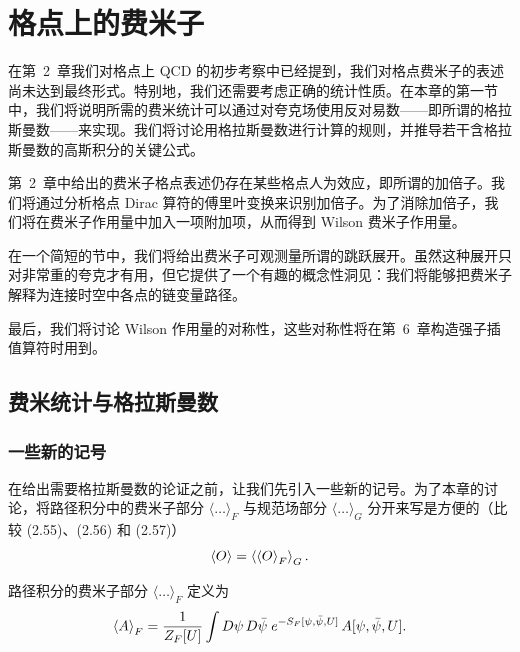 
\chapter{格点上的费米子}

在第~2~章我们对格点上 QCD 的初步考察中已经提到，我们对格点费米子的表述尚未达到最终形式。特别地，我们还需要考虑正确的统计性质。在本章的第一节中，我们将说明所需的费米统计可以通过对夸克场使用反对易数——即所谓的格拉斯曼数——来实现。我们将讨论用格拉斯曼数进行计算的规则，并推导若干含格拉斯曼数的高斯积分的关键公式。

第~2~章中给出的费米子格点表述仍存在某些格点人为效应，即所谓的加倍子。我们将通过分析格点 Dirac 算符的傅里叶变换来识别加倍子。为了消除加倍子，我们将在费米子作用量中加入一项附加项，从而得到 Wilson 费米子作用量。

在一个简短的节中，我们将给出费米子可观测量所谓的跳跃展开。虽然这种展开只对非常重的夸克才有用，但它提供了一个有趣的概念性洞见：我们将能够把费米子解释为连接时空中各点的链变量路径。

最后，我们将讨论 Wilson 作用量的对称性，这些对称性将在第~6~章构造强子插值算符时用到。

\section{费米统计与格拉斯曼数}

\subsection{一些新的记号}

在给出需要格拉斯曼数的论证之前，让我们先引入一些新的记号。为了本章的讨论，将路径积分中的费米子部分 $\langle\ldots\rangle_F$ 与规范场部分 $\langle\ldots\rangle_G$ 分开来写是方便的（比较 (2.55)、(2.56) 和 (2.57)）
\begin{equation}
  \left\langle O \right\rangle = \left\langle \left\langle O \right\rangle_F \right\rangle_G .
\end{equation}

路径积分的费米子部分 $\langle\ldots\rangle_F$ 定义为
\begin{equation}
  \left\langle A \right\rangle_F =
    \frac{1}{Z_F[U]}\int D\psi\,D\bar{\psi}\;
    e^{-S_F[\psi,\bar{\psi},U]}\,A[\psi,\bar{\psi},U] .
\end{equation}

